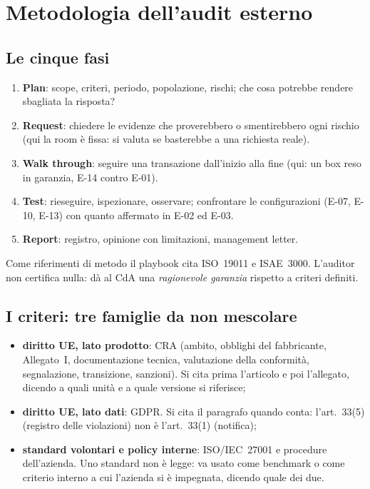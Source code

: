\section{Metodologia dell'audit esterno}

\subsection{Le cinque fasi}
\begin{enumerate}
  \item \textbf{Plan}: scope, criteri, periodo, popolazione, rischi; che cosa potrebbe rendere
    sbagliata la risposta?
  \item \textbf{Request}: chiedere le evidenze che proverebbero o smentirebbero ogni rischio (qui la
    room è fissa: si valuta se basterebbe a una richiesta reale).
  \item \textbf{Walk through}: seguire una transazione dall'inizio alla fine (qui: un box reso in
    garanzia, E-14 contro E-01).
  \item \textbf{Test}: rieseguire, ispezionare, osservare; confrontare le configurazioni (E-07, E-10,
    E-13) con quanto affermato in E-02 ed E-03.
  \item \textbf{Report}: registro, opinione con limitazioni, management letter.
\end{enumerate}
Come riferimenti di metodo il playbook cita ISO~19011 e ISAE~3000. L'auditor non certifica nulla: dà
al CdA una \emph{ragionevole garanzia} rispetto a criteri definiti.

\subsection{I criteri: tre famiglie da non mescolare}
\begin{itemize}
  \item \textbf{diritto UE, lato prodotto}: CRA (ambito, obblighi del fabbricante, Allegato~I,
    documentazione tecnica, valutazione della conformità, segnalazione, transizione, sanzioni). Si
    cita prima l'articolo e poi l'allegato, dicendo a quali unità e a quale versione si riferisce;
  \item \textbf{diritto UE, lato dati}: GDPR. Si cita il paragrafo quando conta: l'art.~33(5)
    (registro delle violazioni) non è l'art.~33(1) (notifica);
  \item \textbf{standard volontari e policy interne}: ISO/IEC~27001 e procedure dell'azienda. Uno
    standard non è legge: va usato come benchmark o come criterio interno a cui l'azienda si è
    impegnata, dicendo quale dei due.
\end{itemize}

